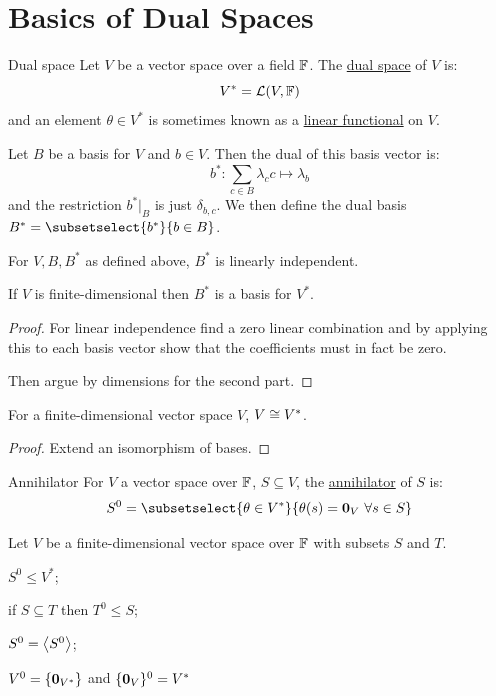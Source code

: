 \documentclass[../Main.tex]{subfiles}
\begin{document}
\section{Basics of Dual Spaces}
\begin{definition}{Dual space}
    Let $V$ be a vector space over a field $\mathbb{F}$. The \underline{dual space} of $V$ is:
    \begin{equation*}
        V^* = \mathcal{L}(V, \mathbb{F})
    \end{equation*}
    and an element $\theta \in V^*$ is sometimes known as a \underline{linear functional} on $V$.
\end{definition}
Let $B$ be a basis for $V$ and $b \in V$. Then the dual of this basis vector is:
\begin{equation*}
    b^* : \sum_{c \in B} \lambda_c c \mapsto \lambda_b
\end{equation*}
and the restriction $b^*|_B$ is just $\delta_{b, c}$. We then define the dual basis $B^* = \subsetselect{b^*}{b \in B}$.
\begin{proposition}
    For $V, B, B^*$ as defined above, $B^*$ is linearly independent.

    If $V$ is finite-dimensional then $B^*$ is a basis for $V^*$.
    \label{propDualBasis}
\end{proposition}
\begin{proof}
    For linear independence find a zero linear combination and by applying this to each basis vector show that the coefficients must in fact be zero.

    Then argue by dimensions for the second part.
\end{proof}
\begin{corollary}
    For a finite-dimensional vector space $V$, $V \cong V^*$.
    \label{corDualSpaceIsom}
\end{corollary}
\begin{proof}
    Extend an isomorphism of bases.
\end{proof}
\begin{definition}{Annihilator}
    For $V$ a vector space over $\mathbb{F}$, $S \subseteq V$, the \underline{annihilator} of $S$ is:
    \begin{equation*}
        S^0 = \subsetselect{\theta \in V^*}{\theta(s) = \zv_V~\forall s \in S}
    \end{equation*}
\end{definition}
\begin{propositions}{
        Let $V$ be a finite-dimensional vector space over $\mathbb{F}$ with subsets $S$ and $T$.
        \label{propsAnnihProps}
    }
    \item $S^0 \leq V^*$; \label{propAnnihSubspace}
    \item if $S \subseteq T$ then $T^0 \leq S$; \label{propAnnihSubsetReverse}
    \item $S^0 = \left\langle S^0 \right\rangle$; \label{propAnnihIsSpan}
    \item $V^0 = \{\boldsymbol{0}_{V^*}\}$ and $\{\boldsymbol{0}_V\}^0 = V^*$ \label{propAnnihOfZero}
\end{propositions}
\end{document}
